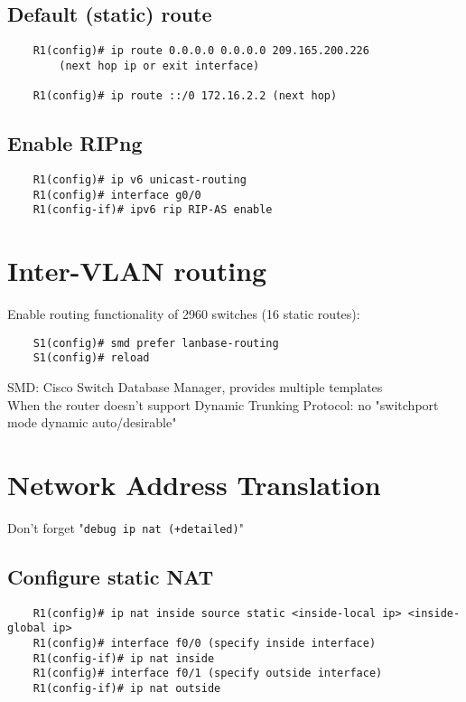 \documentclass[10pt, a4paper]{article}
\begin{document}
	\subsection{Default (static) route}
	\begin{lstlisting}
	R1(config)# ip route 0.0.0.0 0.0.0.0 209.165.200.226
		(next hop ip or exit interface)

	R1(config)# ip route ::/0 172.16.2.2 (next hop)
	\end{lstlisting}

	\subsection{Enable RIPng}
	\begin{lstlisting}
	R1(config)# ip v6 unicast-routing
	R1(config)# interface g0/0
	R1(config-if)# ipv6 rip RIP-AS enable
	\end{lstlisting}

	\section{Inter-VLAN routing}
	Enable routing functionality of 2960 switches (16 static routes):\\
	\begin{lstlisting}
	S1(config)# smd prefer lanbase-routing
	S1(config)# reload
	\end{lstlisting}
	SMD: Cisco Switch Database Manager, provides multiple templates\\
	When the router doesn't support Dynamic Trunking Protocol: no "switchport mode dynamic auto/desirable"

	\section{Network Address Translation}
	Don't forget "\texttt{debug ip nat (+detailed)}"
	\subsection{Configure static NAT}
	\begin{lstlisting}
	R1(config)# ip nat inside source static <inside-local ip> <inside-global ip>
	R1(config)# interface f0/0 (specify inside interface)
	R1(config-if)# ip nat inside
	R1(config)# interface f0/1 (specify outside interface)
	R1(config-if)# ip nat outside
	\end{lstlisting}
\end{document}
